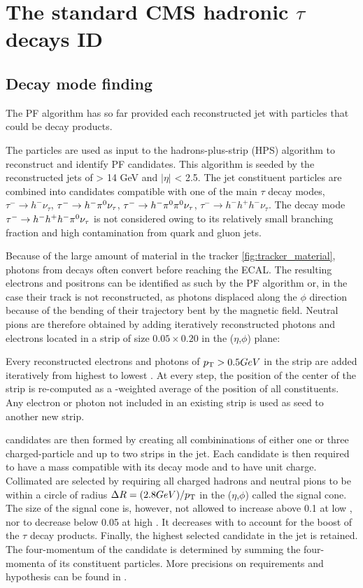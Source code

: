 \section{The standard CMS hadronic $\tau$ decays ID}
\label{sec:std_tau_id}
\subsection{Decay mode finding}

The PF algorithm has so far provided each reconstructed jet with particles that could be \tauh decay products.

The particles are used as input to the hadrons-plus-strip (HPS) algorithm \cite{tauh_reconstruction} to reconstruct and identify PF \tauh candidates. 
This algorithm is seeded by the reconstructed jets of \pt > 14 GeV and $|\eta|$ < 2.5.
The jet constituent particles are combined into \tauh candidates compatible with one of the main $\tau$ decay modes, $\tau^- \rightarrow h^- \nu_\tau$, $\tau^- \rightarrow h^- \pi^{0} \nu_\tau$, $\tau^- \rightarrow h^- \pi^{0} \pi^{0} \nu_\tau$, $\tau^- \rightarrow h^- h^+ h^- \nu_\tau$. The decay mode $\tau^- \rightarrow h^- h^+ h^- \pi^{0} \nu_\tau$ is not considered owing to its relatively small branching fraction and high contamination from quark and gluon jets.

Because of the large amount of material in the tracker \ref{fig:tracker_material}, photons from \pizero decays often convert before reaching the ECAL. The resulting electrons and positrons can be identified as such by the PF algorithm or, in the case their track is not reconstructed, as photons displaced along the $\phi$ direction because of the bending of their trajectory bent by the magnetic field.
Neutral pions are therefore obtained by adding iteratively reconstructed photons and electrons located in a strip of size $0.05 \times 0.20$ in the ($\eta$,$\phi$) plane:

Every reconstructed electrons and photons of $p_{\mathrm{T}} > 0.5 GeV$ in the strip are added iteratively from highest to lowest \pt.
At every step, the position of the center of the strip is re-computed as a \pt-weighted average of the position of all constituents.
Any electron or photon not included in an existing strip is used as seed to another new strip.

\tauh candidates are then formed by creating all combininations of either one or three charged-particle and up to two strips in the jet.
Each \tauh candidate is then required to have a mass compatible with its decay mode and to have unit charge.
Collimated \tauh are selected by requiring all charged hadrons and neutral pions to be within a circle of radius $\Delta R = (2.8 GeV)/p_{\mathrm{T}}$ in the ($\eta$,$\phi$) called the signal cone.
The size of the signal cone is, however, not allowed to increase above 0.1 at low \pt, nor to decrease below 0.05 at high \pt. It decreases with \pt to account for the boost of the $\tau$ decay products. Finally, the highest \pt selected \tauh candidate in the jet is retained. The four-momentum of the \tauh candidate is determined by summing the four-momenta of its constituent particles.
More precisions on requirements and hypothesis can be found in \cite{tauh_reconstruction}.

